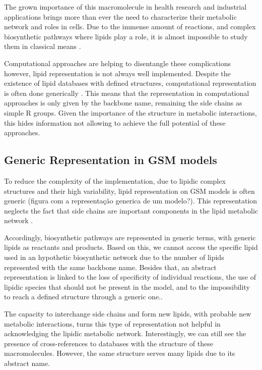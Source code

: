 \documentclass{llncs}
\begin{document}
The grown importance of this macromolecule in health research and industrial applications brings more than ever the need to characterize their metabolic network and roles in cells.
Due to the immense amount of reactions, and complex biosynthetic pathways where lipids play a role, it is almost impossible to study them in classical means \cite{Schutzhold}.

Computational approaches are helping to disentangle these complications however, lipid representation is not always well implemented.
Despite the existence of lipid databases with defined structures, computational representation is often done generically \cite{Aung2013}. 
This means that the representation in computational approaches is only given by the backbone name, remaining the side chains as simple R groups.
Given the importance of the structure in metabolic interactions, this hides information not allowing to achieve the full potential of these approaches.

\subsection{Generic Representation in GSM models}
To reduce the complexity of the implementation, due to lipidic complex structures and their high variability, lipid representation on GSM models is often generic (figura com a representação generica de um modelo?). This representation neglects the fact that side chains are important components in the lipid metabolic network \cite{Fahy2011,Schutzhold}.

Accordingly, biosynthetic pathways are represented in generic terms, with generic lipids as reactants and products.
Based on this, we cannot access the specific lipid used in an hypothetic biosynthetic network due to the number of lipids represented with the same backbone name.
Besides that, an abstract representation is linked to the loss of specificity of individual reactions, the use of lipidic species that should not be present in the model, and to the impossibility to reach a defined structure through a generic one.\cite{Aung2013}.

The capacity to interchange side chains and form new lipids, with probable new metabolic interactions, turns this type of representation not helpful in acknowledging the lipidic metabolic network.
Interestingly, we can still see the presence of cross-references to databases with the structure of these macromolecules. However, the same structure serves many lipids due to its abstract name.
\end{document}
